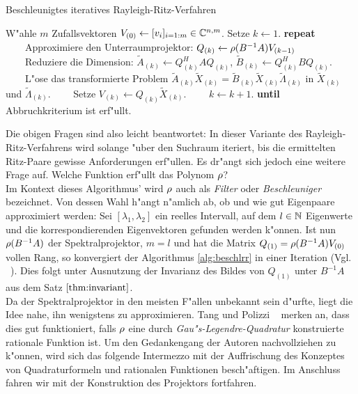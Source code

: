 \begin{algorithm}\label{alg:beschlrr}
\caption{Beschleunigtes iteratives Rayleigh-Ritz-Verfahren}\label{euclid}
\begin{algorithmic}[1]
\State W"ahle $m$ Zufallsvektoren $V_{(0)} \gets [v_i]_{i=1:m} \in\mathbb{C}^{n,m}$.
Setze $k \gets 1$.
\State \textbf{repeat}
\State \ \ \ \ Approximiere den Unterraumprojektor: $Q_{(k)} \gets \rho(B^{-1}A)V_{(k-1)}$
\State \ \ \ \ Reduziere die Dimension: $\widetilde{A}_{(k)} \gets Q_{(k)}^H A Q_{(k)}$,
$\widetilde{B}_{(k)} \gets Q_{(k)}^H B Q_{(k)}$.
\State \ \ \ \ L"ose das transformierte Problem $\widetilde{A}_{(k)}\widetilde{X}_{(k)}
= \widetilde{B}_{(k)}\widetilde{X}_{(k)}\widetilde{\Lambda}_{(k)}$ in
$\widetilde{X}_{(k)}$ und $\widetilde{\Lambda}_{(k)}$.
\State \ \ \ \ Setze $V_{(k)} \gets Q_{(k)}\widetilde{X}_{(k)}$.
\State \ \ \ \ $k \gets k+1$.
\State \textbf{until} Abbruchkriterium ist erf"ullt.
\end{algorithmic}
\end{algorithm}



Die obigen Fragen sind also leicht beantwortet: In dieser Variante des Rayleigh-Ritz-Verfahrens wird solange "uber den Suchraum iteriert, bis die ermittelten Ritz-Paare gewisse Anforderungen erf"ullen.
Es dr"angt sich jedoch eine weitere Frage auf. Welche Funktion erf"ullt das Polynom $\rho$?\\

Im Kontext dieses Algorithmus' wird $\rho$ auch als \emph{Filter} oder \emph{Beschleuniger}
bezeichnet. Von dessen Wahl h"angt n"amlich ab, ob und wie gut Eigenpaare approximiert
werden: Sei $[\lambda_1,\lambda_2]$ ein reelles Intervall, auf dem $l\in\mathbb{N}$ Eigenwerte und die korrespondierenden Eigenvektoren gefunden werden k"onnen. Ist nun $\rho(B^{-1}A)$ der Spektralprojektor,
$m=l$ und hat die Matrix $Q_{(1)} = \rho(B^{-1}A) V_{(0)}$ vollen Rang, so konvergiert der Algorithmus \ref{alg:beschlrr} in einer Iteration
(Vgl. ~\cite[356]{ptep}).
Dies folgt unter Ausnutzung der Invarianz des Bildes von $Q_{(1)}$ unter $B^{-1}A$
aus dem Satz $\ref{thm:invariant}$.\\

Da der Spektralprojektor in den meisten F"allen unbekannt sein d"urfte, liegt
die Idee nahe, ihn wenigstens zu approximieren. Tang und Polizzi ~\cite[356]{ptep} merken an, dass dies gut funktioniert, falls $\rho$ eine durch \emph{Gau"s-Legendre-Quadratur} konstruierte rationale Funktion ist.
Um den Gedankengang der Autoren nachvollziehen zu k"onnen, wird sich das folgende Intermezzo mit der Auffrischung des Konzeptes von Quadraturformeln und rationalen Funktionen besch"aftigen. Im Anschluss fahren wir mit der
Konstruktion des Projektors fortfahren.

